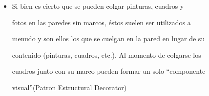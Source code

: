 \documentclass[10pt]{article}
\begin{document}
\begin{itemize}


\item Si bien es cierto que se pueden colgar pinturas, cuadros y

fotos en las paredes sin marcos, éstos suelen ser utilizados a

menudo y son ellos los que se cuelgan en la pared en lugar de su

contenido (pinturas, cuadros, etc.). Al momento de colgarse los

cuadros junto con su marco pueden formar un solo “componente

visual”(Patron Estructural Decorator)
\end{itemize}



\
\end{document}
